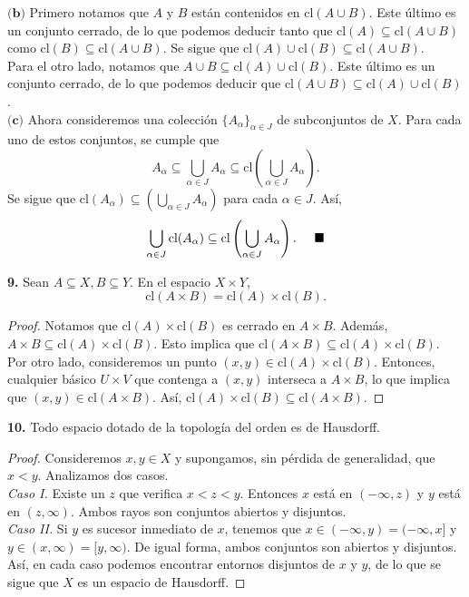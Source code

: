 \documentclass{article}
\begin{document}
$\textbf{(b)}$ Primero notamos que $A$ y $B$ están contenidos en $\text{cl}(A \cup B)$. Este último es un conjunto cerrado, de lo que podemos deducir tanto que $\text{cl}(A) \subseteq \text{cl}(A \cup  B)$ como $\text{cl}(B) \subseteq \text{cl}(A \cup  B)$. Se sigue que $\text{cl}(A) \cup \text{cl}(B) \subseteq \text{cl}(A \cup  B)$. \\
Para el otro lado, notamos que $A \cup B \subseteq \text{cl}(A) \cup \text{cl}(B)$. Este último es un conjunto cerrado, de lo que podemos deducir que $\text{cl}(A \cup B) \subseteq \text{cl}(A) \cup \text{cl}(B)$. \\

$\textbf{(c)}$   Ahora consideremos una colección $\{ A_{\alpha} \}_{\alpha \in J}$ de subconjuntos de $X$.  Para cada uno de estos conjuntos, se cumple que
$$ A_{\alpha} \subseteq \bigcup_{\alpha \in J} A_{\alpha} \subseteq \text{cl} \left( \bigcup_{\alpha \in J} A_{\alpha} \right). $$
Se sigue que $\text{cl}(A_{\alpha}) \subseteq \left( \bigcup_{\alpha \in J} A_{\alpha} \right)$ para cada $\alpha \in J$. Así,
$$ \bigcup_{\alpha \in J} \text{cl}(A_{\alpha})  \subseteq \text{cl} \left( \bigcup_{\alpha \in J} A_{\alpha} \right). \hspace{0.5cm} \blacksquare $$

\begin{mybox}
	\textbf{9. }Sean $A \subseteq X, B \subseteq Y$. En el espacio $X \times Y$,
	$$ \text{cl}(A \times B) = \text{cl}(A) \times \text{cl}(B) .$$
\end{mybox}	
\begin{proof}
	Notamos que $\text{cl}(A) \times \text{cl}(B)$ es cerrado en $A \times B$. Además, $A \times B \subseteq \text{cl}(A) \times \text{cl}(B)$. Esto implica que $\text{cl}(A \times B) \subseteq \text{cl}(A) \times \text{cl}(B)$.\\
	Por otro lado, consideremos un punto $(x, y) \in \text{cl}(A) \times \text{cl}(B)$. Entonces, cualquier básico $U \times V$ que contenga a $(x, y)$ interseca a $A \times B$, lo que implica que $(x, y) \in \text{cl}(A \times B)$. Así, $\text{cl}(A) \times \text{cl}(B) \subseteq \text{cl}(A \times B). $ 
\end{proof}
\newpage
\begin{mybox}
	\textbf{10. } Todo espacio dotado de la topología del orden es de Hausdorff. 
\end{mybox}	
\begin{proof}
	Consideremos $x, y \in X$ y supongamos, sin pérdida de generalidad, que $x < y$. Analizamos dos casos. \\
	\textit{Caso I. } Existe un $z$ que verifica $x < z < y$. Entonces $x$ está en $(- \infty, z)$ y $y$ está en  $(z, \infty)$. Ambos rayos son conjuntos abiertos y disjuntos. \\
	\textit{Caso II. } Si $y$ es sucesor inmediato de $x$, tenemos que $x \in ( - \infty, y) = (- \infty,x]$ y $y \in (x, \infty) = [y, \infty)$. De igual forma, ambos conjuntos son abiertos y disjuntos. \\
	Así, en cada caso podemos encontrar entornos disjuntos de $x$ y $y$, de lo que se sigue que $X$ es un espacio de Hausdorff. 
\end{proof}
\end{document}
